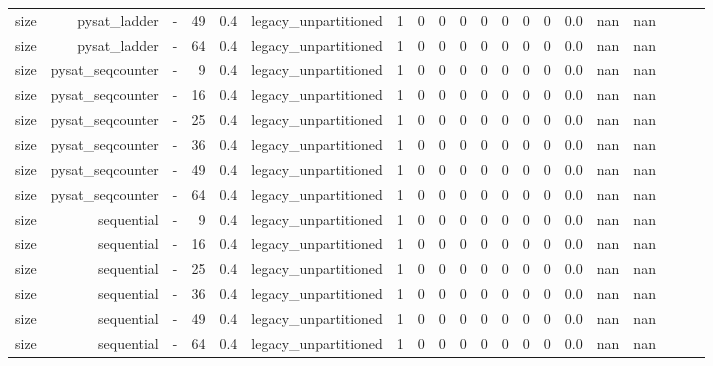 \begin{tabular}{lrrrrrrrrrrrrrrrrrrr}
size & pysat\_ladder & - & 49 & 0.4 & legacy\_unpartitioned & 1 & 0 & 0 & 0 & 0 & 0 & 0 & 0 & 0.0 & nan & nan &  &  &  \\
size & pysat\_ladder & - & 64 & 0.4 & legacy\_unpartitioned & 1 & 0 & 0 & 0 & 0 & 0 & 0 & 0 & 0.0 & nan & nan &  &  &  \\
size & pysat\_seqcounter & - & 9 & 0.4 & legacy\_unpartitioned & 1 & 0 & 0 & 0 & 0 & 0 & 0 & 0 & 0.0 & nan & nan &  &  &  \\
size & pysat\_seqcounter & - & 16 & 0.4 & legacy\_unpartitioned & 1 & 0 & 0 & 0 & 0 & 0 & 0 & 0 & 0.0 & nan & nan &  &  &  \\
size & pysat\_seqcounter & - & 25 & 0.4 & legacy\_unpartitioned & 1 & 0 & 0 & 0 & 0 & 0 & 0 & 0 & 0.0 & nan & nan &  &  &  \\
size & pysat\_seqcounter & - & 36 & 0.4 & legacy\_unpartitioned & 1 & 0 & 0 & 0 & 0 & 0 & 0 & 0 & 0.0 & nan & nan &  &  &  \\
size & pysat\_seqcounter & - & 49 & 0.4 & legacy\_unpartitioned & 1 & 0 & 0 & 0 & 0 & 0 & 0 & 0 & 0.0 & nan & nan &  &  &  \\
size & pysat\_seqcounter & - & 64 & 0.4 & legacy\_unpartitioned & 1 & 0 & 0 & 0 & 0 & 0 & 0 & 0 & 0.0 & nan & nan &  &  &  \\
size & sequential & - & 9 & 0.4 & legacy\_unpartitioned & 1 & 0 & 0 & 0 & 0 & 0 & 0 & 0 & 0.0 & nan & nan &  &  &  \\
size & sequential & - & 16 & 0.4 & legacy\_unpartitioned & 1 & 0 & 0 & 0 & 0 & 0 & 0 & 0 & 0.0 & nan & nan &  &  &  \\
size & sequential & - & 25 & 0.4 & legacy\_unpartitioned & 1 & 0 & 0 & 0 & 0 & 0 & 0 & 0 & 0.0 & nan & nan &  &  &  \\
size & sequential & - & 36 & 0.4 & legacy\_unpartitioned & 1 & 0 & 0 & 0 & 0 & 0 & 0 & 0 & 0.0 & nan & nan &  &  &  \\
size & sequential & - & 49 & 0.4 & legacy\_unpartitioned & 1 & 0 & 0 & 0 & 0 & 0 & 0 & 0 & 0.0 & nan & nan &  &  &  \\
size & sequential & - & 64 & 0.4 & legacy\_unpartitioned & 1 & 0 & 0 & 0 & 0 & 0 & 0 & 0 & 0.0 & nan & nan &  &  &  \\
\bottomrule
\end{tabular}
